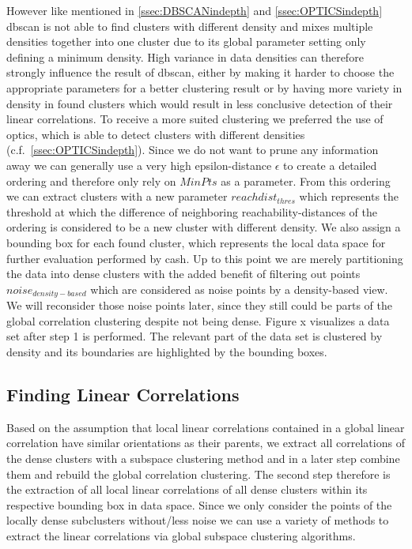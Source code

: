 However like mentioned in \autoref{ssec:DBSCANindepth} and \autoref{ssec:OPTICSindepth} \gls{dbscan} is not able to find clusters with different density and mixes multiple densities together into one cluster due to its global parameter setting only defining a minimum density. High variance in data densities can therefore strongly influence the result of \gls{dbscan}, either by making it harder to choose the appropriate parameters for a better clustering result or by having more variety in density in found clusters which would result in less conclusive detection of their linear correlations. 
To receive a more suited clustering we preferred the use of \gls{optics}, which is able to detect clusters with different densities (c.f.~\autoref{ssec:OPTICSindepth}). Since we do not want to prune any information away we can generally use a very high epsilon-distance $\epsilon$ to create a detailed ordering and therefore only rely on $MinPts$ as a parameter. From this ordering we can extract clusters with a new parameter $reachdist_{thres}$ which represents the threshold at which the difference of neighboring reachability-distances of the ordering is considered to be a new cluster with different density. We also assign a bounding box for each found cluster, which represents the local data space for further evaluation performed by \gls{cash}. Up to this point we are merely partitioning the data into dense clusters with the added benefit of filtering out points $noise_{density-based}$ which are considered as noise points by a density-based view. We will reconsider those noise points later, since they still could be parts of the global correlation clustering despite not being dense. Figure x visualizes a data set after step 1 is performed. The relevant part of the data set is clustered by density and its boundaries are highlighted by the bounding boxes.

\subsection{Finding Linear Correlations}
Based on the assumption that local linear correlations contained in a global linear correlation have similar orientations as their parents, we extract all correlations of the dense clusters with a subspace clustering method and in a later step combine them and rebuild the global correlation clustering. The second step therefore is the extraction of all local linear correlations of all dense clusters within its respective bounding box in data space. Since we only consider the points of the locally dense subclusters without/less noise we can use a variety of methods to extract the linear correlations via global subspace clustering algorithms. 

